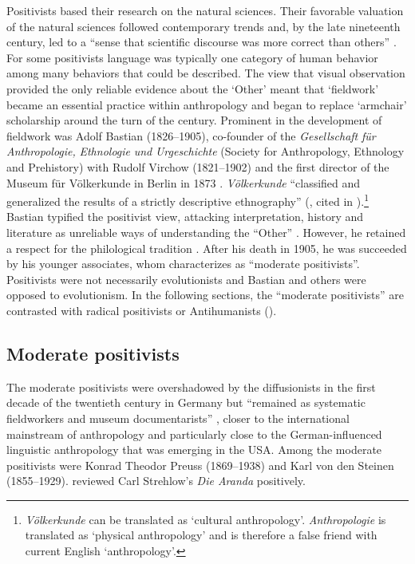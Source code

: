 \documentclass[english,output=paper,colorlinks,citecolor=brown]{../langscibook}
\begin{document}
Positivists based their research on the natural sciences. Their favorable valuation of the natural sciences followed contemporary trends and, by the late nineteenth century, led to a ``sense that scientific discourse was more correct than others'' \citep[154]{Crick1976}. For some positivists language was typically one category of human behavior among many behaviors that could be described. The view that visual observation provided the only reliable evidence about the ‘Other’ meant that ‘fieldwork’ became an essential practice within anthropology and began to replace ‘armchair’ scholarship around the turn of the century. Prominent in the development of fieldwork was Adolf Bastian (1826--1905), co-founder of the \textit{Gesellschaft} \textit{für} \textit{Anthropologie,} \textit{Ethnologie} \textit{und} \textit{Urgeschichte} (Society for Anthropology, Ethnology and Prehistory) with Rudolf Virchow (1821--1902) and the first director of the Museum für Völkerkunde in Berlin in 1873 \citep{Köpping1983}. \textit{Völkerkunde} ``classified and generalized the results of a strictly descriptive ethnography'' (\citealt[19--25]{BuchheitKöpping2001}, cited in \citealt[87]{Gingrich2005}).\footnote{\textit{Völkerkunde} can be translated as `cultural anthropology'. \textit{Anthropologie} is translated as `physical anthropology' \citep[82]{Massin1996} and is therefore a false friend with current English `anthropology'.} Bastian typified the positivist view, attacking interpretation, history and literature as unreliable ways of understanding the ``Other'' \citep[61]{Zimmerman2001}. However, he retained a respect for the philological tradition \citep[89]{Gingrich2005}. After his death in 1905, he was succeeded by his younger associates, whom \citet[91]{Gingrich2005} characterizes as ``moderate positivists''. Positivists were not necessarily evolutionists and Bastian and others were opposed to evolutionism. In the following sections, the ``moderate positivists'' \citep[99]{Gingrich2005} are contrasted with radical positivists or Antihumanists (\citealt{Zimmerman2001, Monteath2013}).

\subsection{Moderate positivists}

The moderate positivists were overshadowed by the diffusionists in the first decade of the twentieth century in Germany but “remained as systematic fieldworkers and museum documentarists” \citep[92]{Gingrich2005}, closer to the international mainstream of anthropology and particularly close to the German-in\-fluen\-ced linguistic anthropology that was emerging in the USA. Among the moderate positivists were Konrad Theodor Preuss (1869--1938) and Karl von den Steinen (1855--1929). \citet{Preuss1908, Preuss1909} reviewed Carl Strehlow’s \textit{Die Aranda} positively.
\end{document}
